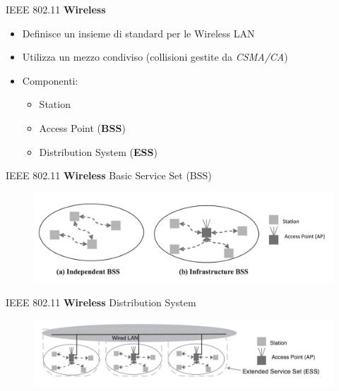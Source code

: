 \begin{frame}{IEEE 802.11}
	\textbf{Wireless}
	\begin{itemize}[<+- | alert@+>]
		\item Definisce un insieme di standard per le Wireless LAN
		\item Utilizza un mezzo condiviso (collisioni gestite da \textit{CSMA/CA})
		\item Componenti:
			\begin{itemize}
				\item Station
				\item Access Point (\textbf{BSS})
				\item Distribution System (\textbf{ESS})
			\end{itemize}
	\end{itemize}
\end{frame}
\begin{frame}{IEEE 802.11}
	\textbf{Wireless}
	\newline
	Basic Service Set (BSS)
		\begin{figure}[h] 
			\includegraphics[scale=0.3,cfbox=blue_slides 1pt 0pt]{imgs/bss.png}
		\end{figure}
	\end{frame}
	\begin{frame}{IEEE 802.11}
	\textbf{Wireless}
	\newline
	Distribution System
		\begin{figure}[h] 
			\includegraphics[scale=0.3,cfbox=blue_slides 1pt 0pt]{imgs/ds.png} %
		\end{figure}
\end{frame}
	
